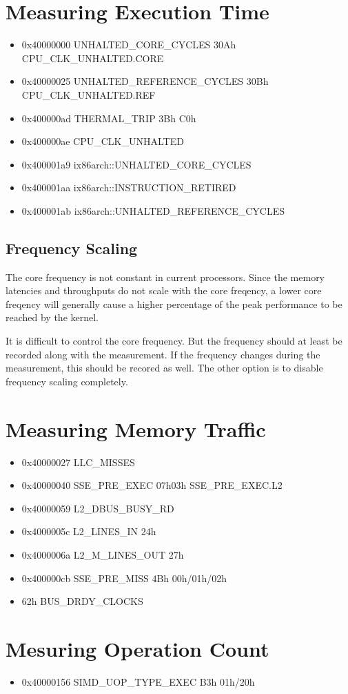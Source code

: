 \documentclass[a4paper,12pt]{article}
\begin{document}
\section{Measuring Execution Time}
\begin{itemize}
\item 0x40000000   UNHALTED\_CORE\_CYCLES 30Ah CPU\_CLK\_UNHALTED.CORE
\item 0x40000025   UNHALTED\_REFERENCE\_CYCLES 30Bh CPU\_CLK\_UNHALTED.REF
\item 0x400000ad   THERMAL\_TRIP 3Bh C0h 
\item 0x400000ae   CPU\_CLK\_UNHALTED
\item 0x400001a9   ix86arch::UNHALTED\_CORE\_CYCLES
\item 0x400001aa   ix86arch::INSTRUCTION\_RETIRED
\item 0x400001ab   ix86arch::UNHALTED\_REFERENCE\_CYCLES 
\end{itemize}
\subsection{Frequency Scaling}
The core frequency is not constant in current processors. Since the memory latencies and throughputs do not scale with the core freqency, a lower core freqency will generally cause a higher percentage of the peak performance to be reached by the kernel.

It is difficult to control the core frequency. But the frequency should at least be recorded along with the measurement. If the frequency changes during the measurement, this should be recored as well. The other option is to disable frequency scaling completely.

\section{Measuring Memory Traffic}
\begin{itemize}
\item 0x40000027   LLC\_MISSES
\item 0x40000040   SSE\_PRE\_EXEC 07h03h SSE\_PRE\_EXEC.L2
\item 0x40000059   L2\_DBUS\_BUSY\_RD
\item 0x4000005c   L2\_LINES\_IN  24h
\item 0x4000006a   L2\_M\_LINES\_OUT  27h
\item 0x400000cb   SSE\_PRE\_MISS 4Bh 00h/01h/02h
\item 62h BUS\_DRDY\_CLOCKS
\end{itemize}


\section{Mesuring Operation Count}
\begin{itemize}
\item 0x40000156   SIMD\_UOP\_TYPE\_EXEC B3h 01h/20h
\end{itemize}


\listoffigures




\end{document}
